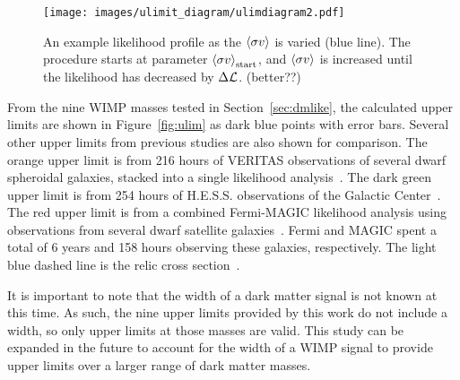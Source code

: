 %
%
%
%

\begin{figure}[bt]
  \centering
  \texttt{[image: images/ulimit\_diagram/ulimdiagram2.pdf]}
  \caption[Upper Limit Calculation]{
    An example likelihood profile as the $\left \langle \sigma v \right \rangle$ is varied (blue line).
    The procedure starts at parameter $\left \langle \sigma v \right \rangle_{\mathrm{start}}$, and $\left \langle \sigma v \right \rangle$ is increased until the likelihood has decreased by $\Delta{}\mathcal{L}$.
    {\color{red}(better??)}
  }
  \label{fig:ulimitdiag}
\end{figure}



From the nine WIMP masses tested in Section~\ref{sec:dmlike}, the calculated upper limits are shown in Figure~\ref{fig:ulim} as dark blue points with error bars.
Several other upper limits from previous studies are also shown for comparison.
The orange upper limit is from 216 hours of VERITAS observations of several dwarf spheroidal galaxies, stacked into a single likelihood analysis~\cite{veritas_dm_limit}.
The dark green upper limit is from 254 hours of H.E.S.S. observations of the Galactic Center~\cite{hessgcul}.
The red upper limit is from a combined Fermi-MAGIC likelihood analysis using observations from several dwarf satellite galaxies~\cite{fermagicul}.
Fermi and MAGIC spent a total of 6 years and 158 hours observing these galaxies, respectively.
The light blue dashed line is the relic cross section~\cite{updatedWIMPRelicCrossSection}.

It is important to note that the width of a dark matter signal is not known at this time.
As such, the nine upper limits provided by this work do not include a width, so only upper limits at those masses are valid.
This study can be expanded in the future to account for the width of a WIMP signal to provide upper limits over a larger range of dark matter masses.


